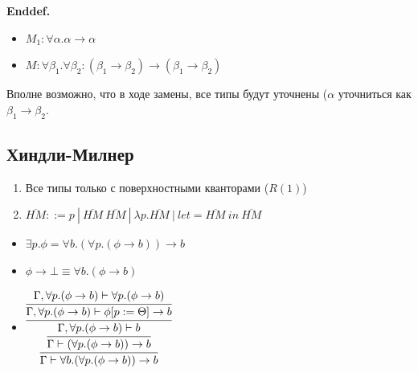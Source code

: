 \noindent\textbf{Enddef.} 

\begin{paracol}{2}
\begin{itemize}[label={}]
    \item $M_1 : \forall \alpha . \alpha \rightarrow \alpha$
    \item $M : \forall \beta_1.\forall \beta_2: (\beta_1 \rightarrow \beta_2) \rightarrow (\beta_1 \rightarrow \beta_2)$
\end{itemize}
\switchcolumn
Вполне возможно, что в ходе замены, все типы будут уточнены ($\alpha$ уточниться как $\beta_1 \rightarrow \beta_2$.
\end{paracol}


\subsection{Хиндли-Милнер}

\begin{enumerate}
    \item Все типы только с поверхностными кванторами ($R(1)$)
    \item $\overline{HM} ::= p\ |\ \overline{HM}\ \overline{HM}\ |\ \lambda p. \overline{HM}\ |\ let =  \overline{HM}\ in\ \overline{HM}$
\end{enumerate}

\begin{itemize}
    \item $\exists p.\phi = \forall b.(\forall p. (\phi \rightarrow b)) \rightarrow b$
    \item $\phi \rightarrow \bot \equiv \forall b. (\phi \rightarrow b)$
    
    \item $\vcenter{\infer[]{\Gamma \vdash \forall b.(\forall p.(\phi \rightarrow b)) \rightarrow b}{\infer{\Gamma \vdash (\forall p. (\phi \rightarrow b)) \rightarrow b}{\infer{\Gamma, \forall p. (\phi \rightarrow b) \vdash b}{\infer{\Gamma, \forall p. (\phi \rightarrow b) \vdash \phi [p := \Theta] \rightarrow b}{\Gamma, \forall p. (\phi \rightarrow b) \vdash \forall p.(\phi \rightarrow b)}}}}}$
\end{itemize}

